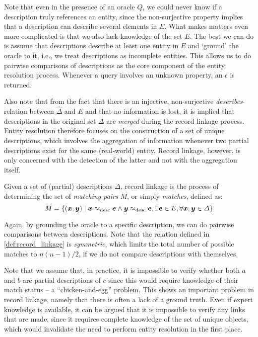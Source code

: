 Note that even in the presence of an oracle $Q$, we could never know if a description truly references an entity, since the non-surjective property implies that a description can describe several elements in $E$.
What makes matters even more complicated is that we also lack knowledge of the set $E$.
The best we can do is assume that descriptions describe at least one entity in $E$ and `ground' the oracle to it, i.e., we treat descriptions as incomplete entities.
This allows us to do pairwise comparisons of descriptions as the core component of the entity resolution process.
Whenever a query involves an unknown property, an $\epsilon$ is returned.

Also note that from the fact that there is an injective, non-surjective \emph{describes}-relation between $\hat{\Delta}$ and $E$ and that no information is lost, it is implied that descriptions in the original set $\Delta$ are \emph{merged} during the record linkage process.
Entity resolution therefore focuses on the construction of a set of unique descriptions, which involves the aggregation of information whenever two partial descriptions exist for the same (real-world) entity.
Record linkage, however, is only concerned with the detection of the latter and not with the aggregation itself.

\begin{definition}
    Given a set of (partial) descriptions $\Delta$, record linkage is the process of determining the set of \emph{matching pairs} $M$, or simply \emph{matches}, defined as:
    \begin{equation*}
        M = \left\{ (\bm{x}, \bm{y}) \mid \bm{x} \approx_\mathrm{desc} \bm{e} \wedge \bm{y} \approx_\mathrm{desc} \bm{e}, \exists \bm{e} \in E, \forall \bm{x}, \bm{y} \in \Delta \right\}
    \end{equation*}
    \label{def:record_linkage}
\end{definition}

Again, by grounding the oracle to a specific description, we can do pairwise comparisons between descriptions.
Note that the relation defined in \cref{def:record_linkage} is \emph{symmetric}, which limits the total number of possible matches to $n(n-1)/2$, if we do not compare descriptions with themselves.

Note that we assume that, in practice, it is impossible to verify whether both $a$ and $b$ are partial descriptions of $c$ since this would require knowledge of their match status -- a ``chicken-and-egg'' problem.
This shows an important problem in record linkage, namely that there is often a lack of a ground truth.
Even if expert knowledge is available, it can be argued that it is impossible to verify any links that are made, since it requires complete knowledge of the set of unique objects, which would invalidate the need to perform entity resolution in the first place.

